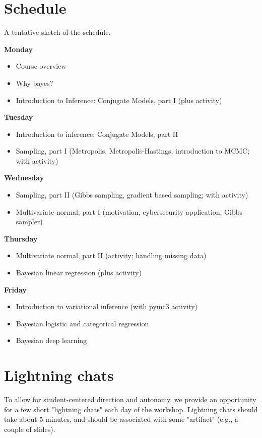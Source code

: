 \documentclass{article} %
\begin{document}
\section{Schedule}

A tentative sketch of the schedule. 


\textbf{Monday}
\begin{itemize}
\item Course overview 
\item Why bayes?
\item Introduction to Inference: Conjugate Models, part I (plus activity)
\end{itemize}

\textbf{Tuesday}

\begin{itemize}
\item Introduction to inference: Conjugate Models, part II
\item Sampling, part I (Metropolis, Metropolis-Hastings, introduction to MCMC; with activity) 
\end{itemize}

\textbf{Wednesday}
\begin{itemize}
\item Sampling, part II (Gibbs sampling, gradient based sampling; with activity) 
\item Multivariate normal, part I (motivation, cybersecurity application, Gibbs sampler)
\end{itemize}

\textbf{Thursday}
\begin{itemize}
\item Multivariate normal, part II (activity; handling missing data)
\item Bayesian linear regression (plus activity)
\end{itemize}

\textbf{Friday}
\begin{itemize}
\item Introduction to variational inference (with pymc3 activity)
\item Bayesian logistic and categorical regression
\item Bayesian deep learning
\end{itemize}


\section{Lightning chats}

To allow for student-centered direction and autonomy, we provide an opportunity for a few short "lightning chats" each day of the workshop.   Lightning chats should take about 5 minutes, and should be associated with some "artifact" (e.g., a couple of slides).
\end{document}
